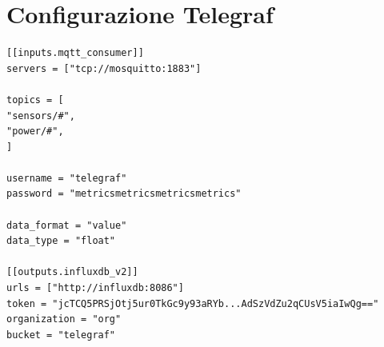 \documentclass[italian,12pt,a4paper,oneside,final]{report}
\begin{document}
\section{Configurazione Telegraf}
\begin{lstlisting}[caption=telegraf.conf]
[[inputs.mqtt_consumer]]
servers = ["tcp://mosquitto:1883"]

topics = [
"sensors/#",
"power/#",
]

username = "telegraf"
password = "metricsmetricsmetricsmetrics"

data_format = "value"
data_type = "float"

[[outputs.influxdb_v2]]
urls = ["http://influxdb:8086"]
token = "jcTCQ5PRSjOtj5ur0TkGc9y93aRYb...AdSzVdZu2qCUsV5iaIwQg=="
organization = "org"  
bucket = "telegraf"
\end{lstlisting}
\end{document}
